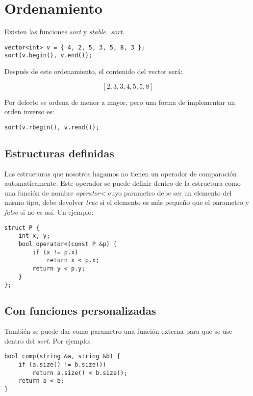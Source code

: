 \documentclass[10pt]{article}
\begin{document}
\section{Ordenamiento}

Existen las funciones \textit{sort} y \textit{stable\_sort}.

\begin{lstlisting}
vector<int> v = { 4, 2, 5, 3, 5, 8, 3 };
sort(v.begin(), v.end());
\end{lstlisting}

Después de este ordenamiento, el contenido del vector será:

\[ [ 2, 3, 3, 4, 5, 5, 8 ] \]

Por defecto se ordena de menor a mayor, pero una forma de implementar un orden inverso es:

\begin{lstlisting}
sort(v.rbegin(), v.rend());
\end{lstlisting}

\subsection{Estructuras definidas}

Las estructuras que nosotros hagamos no tienen un operador de comparación automaticamente. Este operador se puede definir dentro de la estructura como una función de nombre \textit{operator<} cuyo parametro debe ser un elemento del mismo tipo, debe devolver \textit{true} si el elemento es más pequeño que el parametro y \textit{falso} si no es así. Un ejemplo:

\begin{lstlisting}
struct P {
    int x, y;
    bool operator<(const P &p) {
        if (x != p.x)
            return x < p.x;
        return y < p.y;
    }
};
\end{lstlisting}

\subsection{Con funciones personalizadas}

También se puede dar como parametro una función externa para que se use dentro del \textit{sort}. Por ejemplo:

\begin{lstlisting}
bool comp(string &a, string &b) {
    if (a.size() != b.size())
        return a.size() < b.size();
    return a < b;
}
\end{lstlisting}
\end{document}
